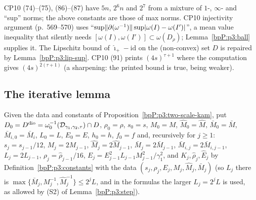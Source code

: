 \begin{remark}\label{bpP:p3:rem-step}
CP10 (74)--(75), (86)--(87) have $5n$, $2^6n$ and $2^7$ from a mixture of $1$-, $\infty$- and ``sup'' norms; the above constants are those of max norms. CP10 injectivity argument (p.~569--570) uses ``$\sup\lVert \partial(\omega^{-1})\rVert\sup\lvert \omega(I)-\omega(I')\rvert$'', a mean value inequality that
silently needs $[\omega(I),\omega(I')]\subset\omega(D_\rho)$; Lemma~\ref{bpP:p3:ball} supplies it. The Lipschitz bound of $\hat\imath_+-\mathrm{id}$ on the (non-convex) set $D$ is repaired by Lemma~\ref{bpP:p3:lip-sup}.
CP10 (91) prints $(4s)^{\tau+1}$ where the computation gives $(4s)^{2(\tau+1)}$ (a sharpening: the printed bound is true, being weaker).
\end{remark}

\subsection{The iterative lemma}\label{bpP:p3:itersec}

\begin{definition}\label{bpP:p3:seq}
Given the data and constants of Proposition~\ref{bpP:p3:two-scale-kam}, put $D_0=D^{\rm dio}=\omega_0^{-1}(\mathcal D_{\gamma_1,\gamma_2,\tau})\cap D$, $\rho_0=\rho$, $s_0=s$, $M_0=M$, $\hat M_0=\hat M$, $\bar M_0=\bar M$, $\bar M_{i,0}=\bar M_i$, $L_0=L$, $E_0=E$, $h_0=h$, $f_0=f$ and, recursively for $j\ge1$:
$s_j=s_{j-1}/12$, $M_j=2M_{j-1}$, $\hat M_j=2\hat M_{j-1}$, $\bar M_j=2\bar M_{j-1}$, $\bar M_{i,j}=2\bar M_{i,j-1}$, $L_j=2L_{j-1}$, $\rho_j=\hat\rho_{j-1}/16$, $E_j=E_{j-1}^2L_{j-1}M_{j-1}^2/\gamma_1^2$,
and $K_j,\hat\rho_j,\hat E_j$ by Definition~\ref{bpP:p3:constants} with the data $(s_j,\rho_j,E_j,M_j,\hat M_j,\bar M_j)$ (so $L_j$ there is $\max\{\bar M_j,M_j^{-1},\hat M_j^{-1}\}\le2^jL$, and in the formulas the larger $L_j=2^jL$ is used, as allowed by (S2) of Lemma~\ref{bpP:p3:step}).
\end{definition}

